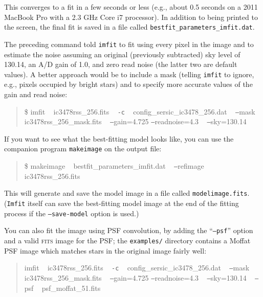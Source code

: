 \documentclass[10pt,a4paper,article]{memoir}
\newcommand{\imfit}{\texttt{imfit}}
\newcommand{\Imfit}{\texttt{Imfit}}
\newcommand{\makeimage}{\texttt{makeimage}}
\begin{document}
This converges to a fit in a few seconds or less (e.g., about 0.5 seconds on a 
2011 MacBook Pro with a 2.3 GHz Core i7 processor). In addition to being printed to
the screen, the final fit is saved in a file called \texttt{bestfit\_parameters\_imfit.dat}.

The preceding command told \imfit{} to fit using every pixel in the image and to estimate
the noise assuming an original (previously subtracted) sky level of 130.14, an A/D gain
of 1.0, and zero read noise (the latter two are default values). A better approach would be 
to include a mask (telling \imfit{}
to ignore, e.g., pixels occupied by bright stars) and to specify more accurate values
of the gain and read noise:
\begin{quote}
\$ imfit ~ ic3478rss\_256.fits ~ \texttt{-c} ~ config\_sersic\_ic3478\_256.dat ~ \texttt{--}mask ~ ic3478rss\_256\_mask.fits ~ \texttt{--}gain=4.725 \texttt{--}readnoise=4.3 ~ \texttt{--}sky=130.14
\end{quote}

If you want to see what the best-fitting model looks like, you can use the companion program \makeimage{}
on the output file:
\begin{quote}
\$ makeimage ~ bestfit\_parameters\_imfit.dat ~ \texttt{--}refimage ~ ic3478rss\_256.fits
\end{quote}
This will generate and save the model image in a file called \texttt{modelimage.fits}. (\Imfit{} itself 
can save the best-fitting model image at the end of the fitting process if
the \texttt{--save-model} option is used.)


You can also fit the image using PSF convolution, by adding the ``\texttt{--psf}'' option and a
valid \textsc{fits} image for the PSF; the \texttt{examples/} directory contains a Moffat PSF image which
matches stars in the original image fairly well:
\begin{quote}
imfit ~ ic3478rss\_256.fits ~ \texttt{-c} ~ config\_sersic\_ic3478\_256.dat ~ \texttt{--}mask ~ ic3478rss\_256\_mask.fits ~ \texttt{--}gain=4.725 \texttt{--}readnoise=4.3 ~ \texttt{--}sky=130.14 ~ \texttt{--}psf ~ psf\_moffat\_51.fits
\end{quote}
\end{document}
